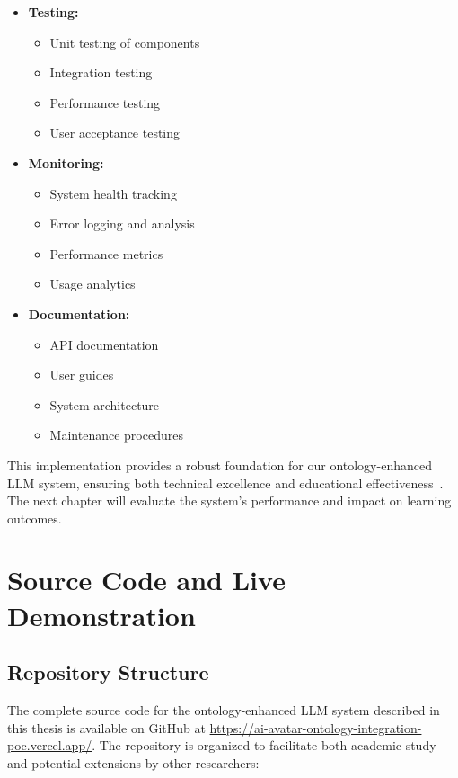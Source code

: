 \begin{itemize}
  \item \textbf{Testing:}
    \begin{itemize}
      \item Unit testing of components
      \item Integration testing
      \item Performance testing
      \item User acceptance testing
    \end{itemize}
  
  \item \textbf{Monitoring:}
    \begin{itemize}
      \item System health tracking
      \item Error logging and analysis
      \item Performance metrics
      \item Usage analytics
    \end{itemize}
  
  \item \textbf{Documentation:}
    \begin{itemize}
      \item API documentation
      \item User guides
      \item System architecture
      \item Maintenance procedures
    \end{itemize}
\end{itemize}

This implementation provides a robust foundation for our ontology-enhanced LLM system, ensuring both technical excellence and educational effectiveness~\cite{liu2024ontology}. The next chapter will evaluate the system's performance and impact on learning outcomes. 


\section{Source Code and Live Demonstration}
\label{sec:code-demo}

\subsection{Repository Structure}
\label{subsec:repo-structure}

The complete source code for the ontology-enhanced LLM system described in this thesis is available on GitHub at \url{https://ai-avatar-ontology-integration-poc.vercel.app/}. The repository is organized to facilitate both academic study and potential extensions by other researchers:

